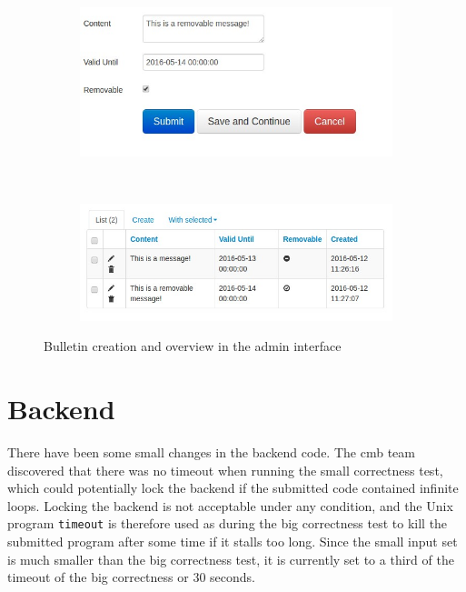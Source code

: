 \begin{figure}
    \centering
    \begin{subfigure}[b]{0.48\textwidth}
        \includegraphics[width=\textwidth]{figs/bulletin_creation.jpg}
    \end{subfigure}
    ~ %
    \begin{subfigure}[b]{0.48\textwidth}
        \includegraphics[width=\textwidth]{figs/bulletin_list.jpg}
    \end{subfigure}
    \caption{Bulletin creation and overview in the admin interface}
    \label{fig:admin-bulletin}
\end{figure}

\section{Backend}
\label{sec:impr-backend}
There have been some small changes in the backend code. The \gls{cmb} team discovered that there was no timeout when running the small correctness test, which could potentially lock the backend if the submitted code contained infinite loops. Locking the backend is not acceptable under any condition, and the Unix program \texttt{timeout} \cite{TIMEOUT} is therefore used as during the big correctness test to kill the submitted program after some time if it stalls too long. Since the small input set is much smaller than the big correctness test, it is currently set to a third of the timeout of the big correctness or 30 seconds. \\

